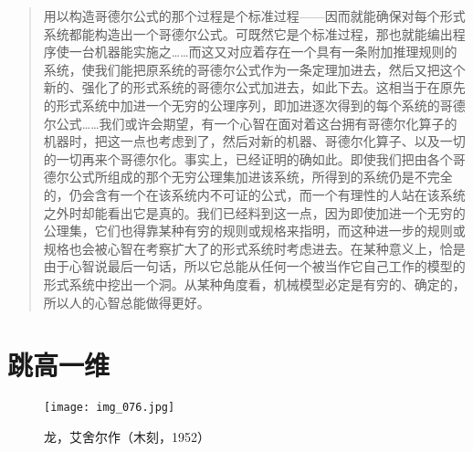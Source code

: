 \begin{quote}
用以构造哥德尔公式的那个过程是个标准过程——因而就能确保对每个形式系统都能构造出一个哥德尔公式。可既然它是个标准过程，那也就能编出程序使一台机器能实施之……而这又对应着存在一个具有一条附加推理规则的系统，使我们能把原系统的哥德尔公式作为一条定理加进去，然后又把这个新的、强化了的形式系统的哥德尔公式加进去，如此下去。这相当于在原先的形式系统中加进一个无穷的公理序列，即加进逐次得到的每个系统的哥德尔公式……我们或许会期望，有一个心智在面对着这台拥有哥德尔化算子的机器时，把这一点也考虑到了，然后对新的机器、哥德尔化算子、以及一切的一切再来个哥德尔化。事实上，已经证明的确如此。即使我们把由各个哥德尔公式所组成的那个无穷公理集加进该系统，所得到的系统仍是不完全的，仍会含有一个在该系统内不可证的公式，而一个有理性的人站在该系统之外时却能看出它是真的。我们已经料到这一点，因为即使加进一个无穷的公理集，它们也得靠某种有穷的规则或规格来指明，而这种进一步的规则或规格也会被心智在考察扩大了的形式系统时考虑进去。在某种意义上，恰是由于心智说最后一句话，所以它总能从任何一个被当作它自己工作的模型的形式系统中挖出一个洞。从某种角度看，机械模型必定是有穷的、确定的，所以人的心智总能做得更好。
\end{quote}

\section{跳高一维}

\begin{figure}
\texttt{[image: img\_076.jpg]}
\caption[龙，艾舍尔作。]
  {龙，艾舍尔作（木刻，1952）}
\end{figure}

